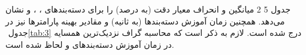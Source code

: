 جدول ‏5 2 میانگین و انحراف معیار دقت (به درصد) را برای دسته‌بندهای ، ،  و نشان می‌دهد. همچنین زمان آموزش دسته‌بندها (به ثانیه) و مقادیر بهینه ‍پارامترها نیز در جدول ‏\ref{tab:3} درج شده است. لازم به ذکر است که محاسبه گراف نزدیک‌ترین همسایه در زمان آموزش دسته‌بندهای  و  لحاظ شده است. 

\begin{table*}[!t]
	\small
	\centering
	\caption{مقایسه دقت و زمان آموزش دسته‌بندهای ، ،   و }
	\tabcolsep=0.13cm %
\end{table*}

